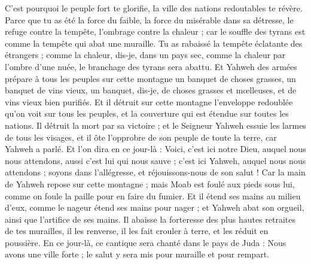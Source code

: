 \begin{multicols}{2}
C'est pourquoi le peuple fort te glorifie, la ville des nations redoutables te révère.
Parce que tu as été la force du faible, la force du misérable dans sa détresse, le refuge contre la tempête, l'ombrage contre la chaleur ; car le souffle des tyrans est comme la tempête qui abat une muraille.
Tu as rabaissé la tempête éclatante des étrangers ; comme la chaleur, dis-je, dans un pays sec, comme la chaleur par l'ombre d'une nuée, le branchage des tyrans sera abattu.
Et Yahweh des armées prépare à tous les peuples sur cette montagne un banquet de choses grasses, un banquet de vins vieux, un banquet, dis-je, de choses grasses et mœlleuses, et de vins vieux bien purifiés.
Et il détruit sur cette montagne l'enveloppe redoublée qu'on voit sur tous les peuples, et la couverture qui est étendue sur toutes les nations.
Il détruit la mort par sa victoire ; et le Seigneur Yahweh essuie les larmes de tous les visages, et il ôte l'opprobre de son peuple de toute la terre, car Yahweh a parlé.
Et l'on dira en ce jour-là : Voici, c'est ici notre Dieu, auquel nous nous attendons, aussi c'est lui qui nous sauve ; c'est ici Yahweh, auquel nous nous attendons ; soyons dans l'allégresse, et réjouissons-nous de son salut !
Car la main de Yahweh repose sur cette montagne ; mais Moab est foulé aux pieds sous lui, comme on foule la paille pour en faire du fumier.
Et il étend ses mains au milieu d'eux, comme le nageur étend ses mains pour nager ; et Yahweh abat son orgueil, ainsi que l'artifice de ses mains.
Il abaisse la forteresse des plus hautes retraites de tes murailles, il les renverse, il les fait crouler à terre, et les réduit en poussière.
\VerseOne{}En ce jour-là, ce cantique sera chanté dans le pays de Juda : Nous avons une ville forte ; le salut y sera mis pour muraille et pour rempart.

\end{multicols}

